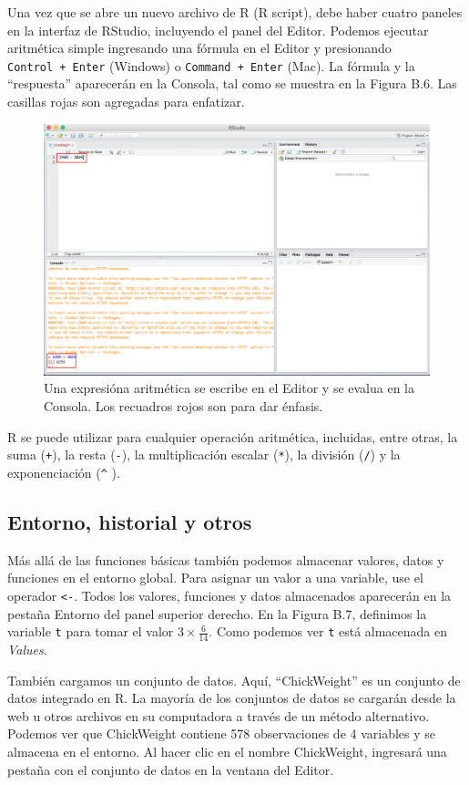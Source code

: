 \documentclass[
  12pt,
  spanish,
]{book}
\begin{document}
Una vez que se abre un nuevo archivo de R (R script), debe haber cuatro paneles en la interfaz de RStudio, incluyendo el panel del Editor. Podemos ejecutar aritmética simple ingresando una fórmula en el Editor y presionando \texttt{Control\ +\ Enter} (Windows) o \texttt{Command\ +\ Enter} (Mac). La fórmula y la ``respuesta'' aparecerán en la Consola, tal como se muestra en la Figura B.6. Las casillas rojas son agregadas para enfatizar.

\begin{figure}
\includegraphics[width=0.6\linewidth]{Images/first_addition} \caption{Una expresióna aritmética se escribe en el Editor y se evalua en la Consola. Los recuadros rojos son para dar énfasis.}\label{fig:firstaddition}
\end{figure}

R se puede utilizar para cualquier operación aritmética, incluidas, entre otras, la suma (\texttt{+}), la resta (\texttt{-}), la multiplicación escalar (\texttt{*}), la división (\texttt{/}) y la exponenciación (\texttt{\^{}} ).

\hypertarget{entorno-historial-y-otros}{%
\subsection{Entorno, historial y otros}\label{entorno-historial-y-otros}}

Más allá de las funciones básicas también podemos almacenar valores, datos y funciones en el entorno global. Para asignar un valor a una variable, use el operador \texttt{\textless{}-}. Todos los valores, funciones y datos almacenados aparecerán en la pestaña Entorno del panel superior derecho. En la Figura B.7, definimos la variable \texttt{t} para tomar el valor \(3 \times \frac {6}{14}\). Como podemos ver \texttt{t} está almacenada en \emph{Values}.

También cargamos un conjunto de datos. Aquí, ``ChickWeight'' es un conjunto de datos integrado en R. La mayoría de los conjuntos de datos se cargarán desde la web u otros archivos en su computadora a través de un método alternativo. Podemos ver que ChickWeight contiene 578 observaciones de 4 variables y se almacena en el entorno. Al hacer clic en el nombre ChickWeight, ingresará una pestaña con el conjunto de datos en la ventana del Editor.
\end{document}

